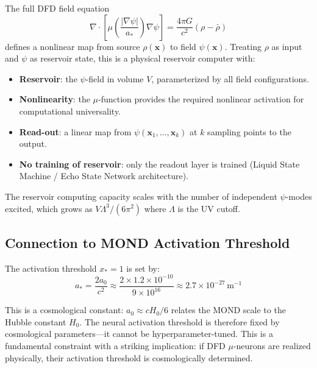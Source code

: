 \documentclass[11pt]{article}
\theoremstyle{definition}
\theoremstyle{remark}
\begin{document}
The full DFD field equation
\begin{equation}
\nabla\cdot\!\left[\mu\!\left(\frac{|\nabla\psi|}{a_*}\right)\nabla\psi\right]
= \frac{4\pi G}{c^2}(\rho - \bar\rho)
\label{eq:dfd_field_eq}
\end{equation}
defines a nonlinear map from source $\rho(\mathbf{x})$ to field
$\psi(\mathbf{x})$. Treating $\rho$ as input and $\psi$ as reservoir
state, this is a physical reservoir computer with:
\begin{itemize}
\item \textbf{Reservoir}: the $\psi$-field in volume $V$, parameterized
  by all field configurations.
\item \textbf{Nonlinearity}: the $\mu$-function provides the required
  nonlinear activation for computational universality.
\item \textbf{Read-out}: a linear map from $\psi(\mathbf{x}_1, \ldots,
  \mathbf{x}_k)$ at $k$ sampling points to the output.
\item \textbf{No training of reservoir}: only the readout layer is trained
  (Liquid State Machine / Echo State Network architecture).
\end{itemize}

The reservoir computing capacity scales with the number of independent
$\psi$-modes excited, which grows as $V\Lambda^3/(6\pi^2)$ where $\Lambda$
is the UV cutoff.

\subsection{Connection to MOND Activation Threshold}
\label{sec:mond_threshold}

The activation threshold $x_* = 1$ is set by:
\begin{equation}
a_* = \frac{2a_0}{c^2} \approx \frac{2 \times 1.2\times 10^{-10}}{9\times 10^{16}}
\approx 2.7\times 10^{-27}\,\mathrm{m}^{-1}
\label{eq:threshold}
\end{equation}

This is a cosmological constant: $a_0 \approx cH_0/6$ relates the
MOND scale to the Hubble constant $H_0$. The neural activation threshold
is therefore fixed by cosmological parameters---it cannot be
hyperparameter-tuned. This is a fundamental constraint with a striking
implication: if DFD $\mu$-neurons are realized physically, their
activation threshold is cosmologically determined.

\end{document}
